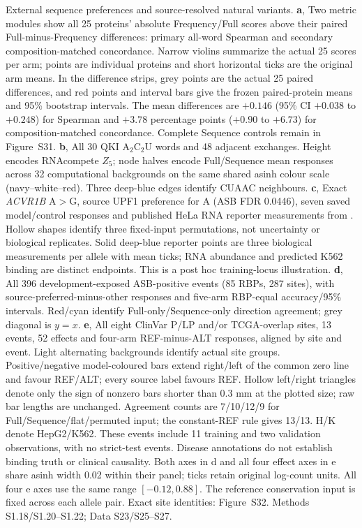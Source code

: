\caption{External sequence preferences and source-resolved natural variants. \textbf{a}, Two metric modules show all 25 proteins' absolute Frequency/Full scores above their paired Full-minus-Frequency differences: primary all-word Spearman and secondary composition-matched concordance. Narrow violins summarize the actual 25 scores per arm; points are individual proteins and short horizontal ticks are the original arm means. In the difference strips, grey points are the actual 25 paired differences, and red points and interval bars give the frozen paired-protein means and 95\% bootstrap intervals. The mean differences are $+0.146$ (95\% CI $+0.038$ to $+0.248$) for Spearman and $+3.78$ percentage points ($+0.90$ to $+6.73$) for composition-matched concordance. Complete Sequence controls remain in Figure~S31. \textbf{b}, All 30 QKI A$_2$C$_2$U words and 48 adjacent exchanges. Height encodes RNAcompete $Z_5$; node halves encode Full/Sequence mean responses across 32 computational backgrounds on the same shared asinh colour scale (navy--white--red). Three deep-blue edges identify CUAAC neighbours. \textbf{c}, Exact \textit{ACVR1B} A$>$G, source UPF1 preference for A (ASB FDR 0.0446), seven saved model/control responses and published HeLa RNA reporter measurements from \citet{yang2019asb}. Hollow shapes identify three fixed-input permutations, not uncertainty or biological replicates. Solid deep-blue reporter points are three biological measurements per allele with mean ticks; RNA abundance and predicted K562 binding are distinct endpoints. This is a post hoc training-locus illustration. \textbf{d}, All 396 development-exposed ASB-positive events (85 RBPs, 287 sites), with source-preferred-minus-other responses and five-arm RBP-equal accuracy/95\% intervals. Red/cyan identify Full-only/Sequence-only direction agreement; grey diagonal is $y=x$. \textbf{e}, All eight ClinVar P/LP and/or TCGA-overlap sites, 13 events, 52 effects and four-arm REF-minus-ALT responses, aligned by site and event. Light alternating backgrounds identify actual site groups. Positive/negative model-coloured bars extend right/left of the common zero line and favour REF/ALT; every source label favours REF. Hollow left/right triangles denote only the sign of nonzero bars shorter than 0.3 mm at the plotted size; raw bar lengths are unchanged. Agreement counts are 7/10/12/9 for Full/Sequence/flat/permuted input; the constant-REF rule gives 13/13. H/K denote HepG2/K562. These events include 11 training and two validation observations, with no strict-test events. Disease annotations do not establish binding truth or clinical causality. Both axes in d and all four effect axes in e share asinh width 0.02 within their panel; ticks retain original log-count units. All four e axes use the same range $[-0.12,0.88]$. The reference conservation input is fixed across each allele pair. Exact site identities: Figure~S32. Methods S1.18/S1.20--S1.22; Data S23/S25--S27.}
